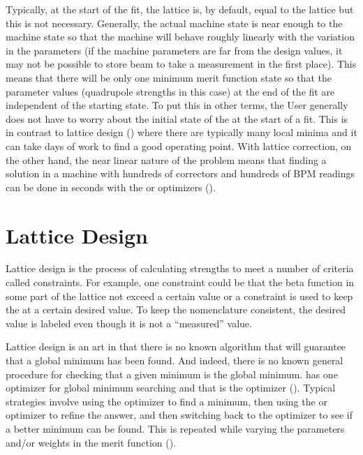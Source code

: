 {{{Typically, at the start of the fit, the  lattice is, by default, equal to the 
lattice but this is not necessary. Generally, the actual machine state is near enough to the
 machine state so that the machine will behave roughly linearly with the variation in the
parameters (if the machine parameters are far from the design values, it may not be possible to
store beam to take a measurement in the first place). This means that there will be only one minimum
merit function state so that the parameter values (quadrupole strengths in this case) at the end of
the fit are independent of the starting state. To put this in other terms, the User generally does
not have to worry about the initial state of the  at the start of a fit. This is in
contrast to lattice design () where there are typically many local minima and it
can take days of work to find a good operating point. With lattice correction, on the other hand,
the near linear nature of the problem means that finding a solution in a machine with hundreds of
correctors and hundreds of BPM readings can be done in seconds with the  or 
optimizers ().

\section{Lattice Design}
\label{s:lat.design}

Lattice design is the process of calculating  strengths to meet a number of criteria
called constraints. For example, one constraint could be that the beta function in some part of the
lattice not exceed a certain value or a constraint is used to keep the  at a certain desired
value. To keep the nomenclature consistent, the desired value is labeled  even though it is not
a ``measured'' value.

Lattice design is an art in that there is no known algorithm that will guarantee that a global
minimum has been found. And indeed, there is no known general procedure for checking that a given
minimum is the global minimum. \tao has one optimizer for global minimum searching and that is the
 optimizer (). Typical strategies involve using the  optimizer to
find a minimum, then using the  or  optimizer to refine the answer, and then
switching back to the  optimizer to see if a better minimum can be found. This is repeated
while varying the  parameters and/or weights in the merit function ().

}}}
